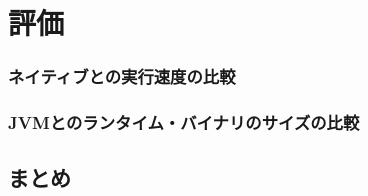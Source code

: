 \chapter{評価}
\label{chap:evaluation}

\subsection{ネイティブとの実行速度の比較}

\subsection{JVMとのランタイム・バイナリのサイズの比較}

\section{まとめ}
